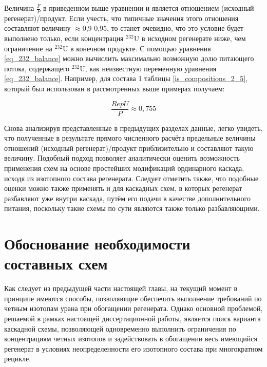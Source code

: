 Величина $\frac{F}{P}$ в приведенном выше уравнении и является отношением (исходный регенерат)/продукт. Если учесть, что типичные значения этого отношения составляют величину $\approx$0,9-0,95, то станет очевидно, что это условие будет выполнено только, если концентрация $^{232}$U в исходном регенерате ниже, чем ограничение на $^{232}$U в конечном продукте. 
С помощью уравнения \ref{eq_232_balance} можно вычислить максимально возможную долю питающего потока, содержащего $^{232}$U, как неизвестную переменную уравнения \ref{eq_232_balance}. Например, для состава 1 таблицы \ref{is_compositions_2_5}, который был использован в рассмотренных выше примерах получаем:


\begin{equation}
  \label{eq_232_balance_X}
    \frac{RepU}{P} \approx 0,755
\end{equation}

Снова анализируя представленные в предыдущих разделах данные, легко увидеть, что полученные в результате прямого численного расчёта предельные величины отношений (исходный регенерат)/продукт приблизительно и составляют такую величину.
Подобный подход позволяет аналитически оценить возможность применения схем на основе простейших модификаций ординарного каскада, исходя из изотопного состава регенерата. Следует отметить также, что подобные оценки можно также применять и для каскадных схем, в которых регенерат разбавляют уже внутри каскада, путём его подачи в качестве дополнительного питания, поскольку такие схемы по сути являются также только разбавляющими.

\section{Обоснование необходимости составных схем}\label{sec:ch2/sec2}

Как следует из предыдущей части настоящей главы, на текущий момент в принципе имеются способы, позволяющие обеспечить выполнение требований по четным изотопам урана при обогащении регенерата. Однако основной проблемой, решаемой в рамках настоящей диссертационной работы, является поиск варианта каскадной схемы, позволяющей одновременно выполнить ограничения по концентрациям четных изотопов и задействовать в обогащении весь имеющийся регенерат в условиях неопределенности его изотопного состава при многократном рецикле.

